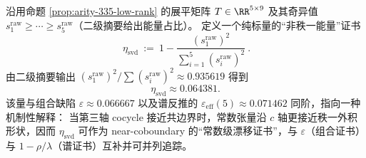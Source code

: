 \begin{remark}\label{rem:arity-335-eta-svd}
沿用命题 \ref{prop:arity-335-low-rank} 的展平矩阵 \(T\in\RR^{5\times 9}\) 及其奇异值 \(s_1^{\mathrm{raw}}\ge\cdots\ge s_5^{\mathrm{raw}}\)（二级摘要给出能量占比）。
定义一个纯标量的“非秩一能量”证书
$$
\boxed{\
\eta_{\mathrm{svd}}
\ :=\
1-\frac{(s_1^{\mathrm{raw}})^2}{\sum_{i=1}^5 (s_i^{\mathrm{raw}})^2}\ }.
$$
由二级摘要输出
\(
(s_1^{\mathrm{raw}})^2/\sum (s_i^{\mathrm{raw}})^2\approx 0.935619
\)
得到
$$
\eta_{\mathrm{svd}}\approx 0.064381.
$$
该量与组合缺陷 \(\varepsilon\approx 0.066667\) 以及谱反推的 \(\varepsilon_{\mathrm{eff}}(5)\approx 0.071462\) 同阶，指向一种机制性解释：
当第三轴 cocycle 接近共边界时，常数张量沿 \(c\) 轴更接近秩一外积形状，因而 \(\eta_{\mathrm{svd}}\) 可作为 near-coboundary 的“常数级漂移证书”，与 \(\varepsilon\)（组合证书）与 \(1-\rho/\lambda\)（谱证书）互补并可并列追踪。
\end{remark}
